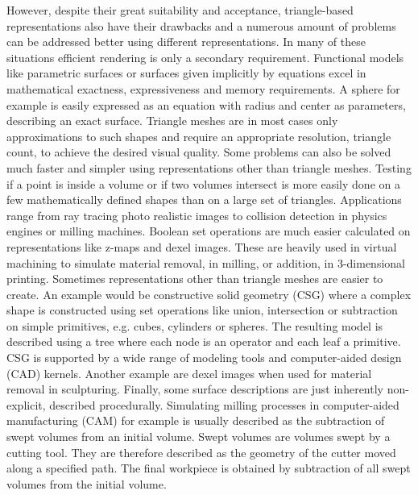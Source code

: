 However, despite their great suitability and acceptance, triangle-based representations also have their drawbacks and a numerous amount of problems can be addressed better using different representations. %
In many of these situations efficient rendering is only a secondary requirement.
Functional models like parametric surfaces or surfaces given implicitly by equations excel in mathematical exactness, expressiveness and memory requirements.
A sphere for example is easily expressed as an equation with radius and center as parameters, describing an exact surface.
Triangle meshes are in most cases only approximations to such shapes and require an appropriate resolution, \ie triangle count, to achieve the desired visual quality.
%
Some problems can also be solved much faster and simpler using representations other than triangle meshes.
Testing if a point is inside a volume or if two volumes intersect is more easily done on a few mathematically defined shapes than on a large set of triangles.
Applications range from ray tracing photo realistic images to collision detection in physics engines or milling machines.
Boolean set operations are much easier calculated on representations like z-maps and dexel images.
These are heavily used in virtual machining to simulate material removal, \eg in milling, or addition, \eg in 3-dimensional printing.
%
Sometimes representations other than triangle meshes are easier to create.
An example would be constructive solid geometry (CSG) where a complex shape is constructed using set operations like union, intersection or subtraction on simple primitives, e.g. cubes, cylinders or spheres.
The resulting model is described using a tree where each node is an operator and each leaf a primitive.
CSG is supported by a wide range of modeling tools and computer-aided design (CAD) kernels.
Another example are dexel images when used for material removal in sculpturing.
%
Finally, some surface descriptions are just inherently non-explicit, \eg described procedurally.
Simulating milling processes in computer-aided manufacturing (CAM) for example is usually described as the subtraction of swept volumes from an initial volume.
Swept volumes are volumes swept by a cutting tool.
They are therefore described as the geometry of the cutter moved along a specified path.
The final workpiece is obtained by subtraction of all swept volumes from the initial volume.


